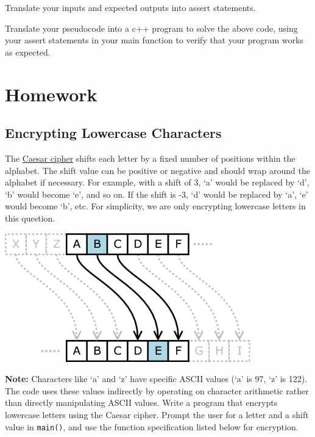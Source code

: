 \vspace{8cm}

\begin{multipart}
Translate your inputs and expected outputs into assert statements.
\end{multipart}

\vspace{8cm}

\begin{multipart}
    Translate your pseudocode into a c++ program to solve the above code, using your assert statements in your main function to verify that your program works as expected.
\end{multipart}


\vspace{8cm}


\section{Homework}

\subsection{Encrypting Lowercase Characters}

The \textcolor{cyan}{\href{https://en.wikipedia.org/wiki/Caesar_cipher}{Caesar cipher}} shifts each letter by a fixed number of positions within the alphabet. The shift value can be positive or negative and should wrap around the alphabet if necessary. For example, with a shift of 3, `a’ would be replaced by `d’, `b’ would become `e’, and so on. If the shift is -3, `d’ would be replaced by `a’, `e’ would become `b’, etc. For simplicity, we are only encrypting lowercase letters in this question.

\includegraphics[width=0.8\textwidth]{images/cipher.png}

\bigbreak
\textbf{Note:} Characters like `a' and `z' have specific ASCII values (`a' is 97, `z' is 122). The code uses these values indirectly by operating on character arithmetic rather than directly manipulating ASCII values.
\bigbreak
Write a program that encrypts lowercase letters using the Caesar cipher. Prompt the user for a letter and a shift value in \texttt{main()}, and use the function specification listed below for encryption.


